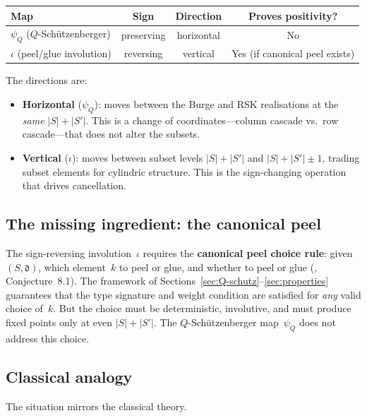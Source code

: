 \documentclass[11pt]{article}
\theoremstyle{plain}
\theoremstyle{definition}
\begin{document}
\begin{center}
\begin{tabular}{l|c|c|c}
\textbf{Map} & \textbf{Sign} & \textbf{Direction} &
  \textbf{Proves positivity?} \\ \hline
$\psi_Q$ ($Q$-Sch\"utzenberger)
  & preserving & horizontal & No \\[3pt]
$\iota$ (peel/glue involution)
  & reversing & vertical & Yes (if canonical peel exists)
\end{tabular}
\end{center}

The directions are:
\begin{itemize}
  \item \textbf{Horizontal} ($\psi_Q$): moves between the
    Burge and RSK realisations at the \emph{same} $|S| + |S'|$.
    This is a change of coordinates---column cascade vs.\ row
    cascade---that does not alter the subsets.
  \item \textbf{Vertical} ($\iota$): moves between subset levels
    $|S| + |S'|$ and $|S| + |S'| \pm 1$, trading subset elements
    for cylindric structure.  This is the sign-changing operation
    that drives cancellation.
\end{itemize}


\subsection{The missing ingredient: the canonical peel}

The sign-reversing involution~$\iota$ requires the
\textbf{canonical peel choice rule}: given
$(S, \mathfrak{d})$, which element~$k$ to peel or glue, and
whether to peel or glue (\cite{LOCAL_RULE}, Conjecture~8.1).
The framework of Sections~\ref{sec:Q-schutz}--\ref{sec:properties}
guarantees that the type signature and weight condition are
satisfied for \emph{any} valid choice of~$k$.  But the choice
must be deterministic, involutive, and must produce fixed points
only at even $|S| + |S'|$.  The $Q$-Sch\"utzenberger
map~$\psi_Q$ does not address this choice.


\subsection{Classical analogy}

The situation mirrors the classical theory.
\end{document}
